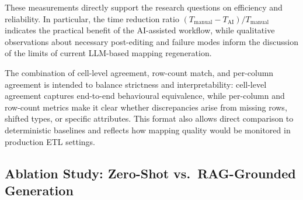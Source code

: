 These measurements directly support the research questions on efficiency and
reliability. In particular, the time reduction ratio
\((T_{\text{manual}} - T_{\text{AI}}) / T_{\text{manual}}\) indicates the
practical benefit of the AI-assisted workflow, while qualitative observations
about necessary post-editing and failure modes inform the discussion of the
limits of current LLM-based mapping regeneration.

The combination of cell-level agreement, row-count match, and per-column agreement is intended to balance strictness and interpretability: cell-level agreement captures end-to-end behavioural equivalence, while per-column and row-count metrics make it clear whether discrepancies arise from missing rows, shifted types, or specific attributes. This format also allows direct comparison to deterministic baselines and reflects how mapping quality would be monitored in production ETL settings.

\subsection{Ablation Study: Zero-Shot vs.\ RAG-Grounded Generation}
\label{sec:method-ablation}

